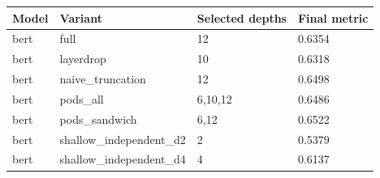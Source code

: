 \begin{tabular}{llll}
\hline
Model & Variant & Selected depths & Final metric \\
\hline
bert & full & 12 & 0.6354 \\
bert & layerdrop & 10 & 0.6318 \\
bert & naive\_truncation & 12 & 0.6498 \\
bert & pods\_all & 6,10,12 & 0.6486 \\
bert & pods\_sandwich & 6,12 & 0.6522 \\
bert & shallow\_independent\_d2 & 2 & 0.5379 \\
bert & shallow\_independent\_d4 & 4 & 0.6137 \\
\hline
\end{tabular}
